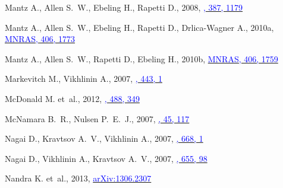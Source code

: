 \documentclass[useAMS,usenatbib,usegraphicx]{mn2e}
\begin{document}
\begin{thebibliography}{}
{Mantz} A., {Allen} S.~W., {Ebeling} H.,  {Rapetti} D., 2008,
  \href{http://adsabs.harvard.edu/abs/2008MNRAS.387.1179M}{\textcolor{blue}{\mnras,
  387, 1179}}

{Mantz} A., {Allen} S.~W., {Ebeling} H., {Rapetti} D.,  {Drlica-Wagner} A.,
  2010a,
  \href{http://adsabs.harvard.edu/abs/2010MNRAS.406.1773M}{\textcolor{blue}{MNRAS,
  406, 1773}}

{Mantz} A., {Allen} S.~W., {Rapetti} D.,  {Ebeling} H., 2010b,
  \href{http://adsabs.harvard.edu/abs/2010MNRAS.406.1759M}{\textcolor{blue}{MNRAS,
  406, 1759}}

{Markevitch} M.,  {Vikhlinin} A., 2007,
  \href{http://adsabs.harvard.edu/abs/2007PhR...443....1M}{\textcolor{blue}{\physrep,
  443, 1}}

{McDonald} M. et~al., 2012,
  \href{http://adsabs.harvard.edu/abs/2012Natur.488..349M}{\textcolor{blue}{\nat,
  488, 349}}

{McNamara} B.~R.,  {Nulsen} P.~E.~J., 2007,
  \href{http://adsabs.harvard.edu/abs/2007ARA%26A..45..117M}{\textcolor{blue}{\araa,
  45, 117}}

{Nagai} D., {Kravtsov} A.~V.,  {Vikhlinin} A., 2007,
  \href{http://adsabs.harvard.edu/abs/2007ApJ...668....1N}{\textcolor{blue}{\apj,
  668, 1}}

{Nagai} D., {Vikhlinin} A.,  {Kravtsov} A.~V., 2007,
  \href{http://adsabs.harvard.edu/cgi-bin/nph-bib_query?bibcode=2007ApJ...655...98N&db_key=AST}{\textcolor{blue}{\apj,
  655, 98}}

{Nandra} K. et~al., 2013,
  \href{http://arxiv.org/abs/1306.2307}{\textcolor{blue}{arXiv:1306.2307}}


\end{thebibliography}
\end{document}
